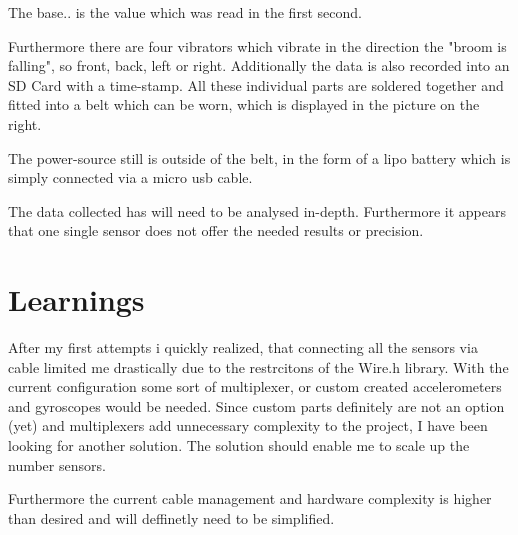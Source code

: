 The base.. is the value which was read in the first second. 

Furthermore there are four vibrators  which vibrate in the direction the "broom is falling", so front, back, left or right. Additionally the data is also recorded into an SD Card with a time-stamp. All these individual parts are soldered together and fitted into a belt which can be worn, which is displayed in the picture on the right.

The power-source still is outside of the belt, in the form of a lipo battery which is simply connected via a micro usb cable.

The data collected has will need to be analysed in-depth. Furthermore it appears that one single sensor does not offer the needed results or precision.

\section{Learnings}

After my first attempts i quickly realized, that connecting all the sensors via cable limited me drastically due to the restrcitons of the Wire.h library. With the current configuration some sort of multiplexer, or custom created accelerometers and gyroscopes would be needed. Since custom parts definitely are not an option (yet) and multiplexers add unnecessary complexity to the project, I have been looking for another solution. The solution should enable me to scale up the number sensors. 

Furthermore the current cable management and hardware complexity is higher than desired and will deffinetly need to be simplified.

